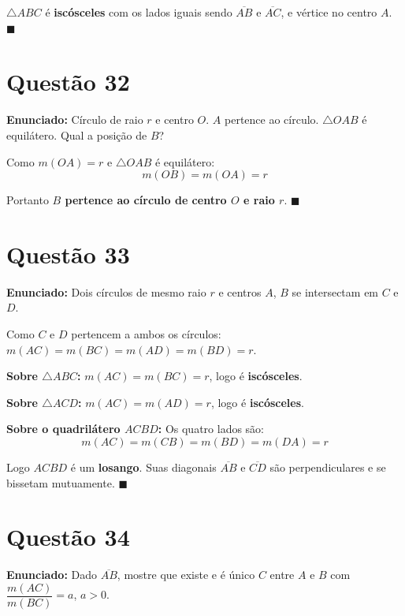 \documentclass[12pt,a4paper]{article}
\begin{document}
$\triangle ABC$ \'e \textbf{isc\'osceles} com os lados iguais sendo $\overline{AB}$ e $\overline{AC}$, e v\'ertice no centro $A$. $\blacksquare$

\section*{Quest\~ao 32}

\textbf{Enunciado:} C\'irculo de raio $r$ e centro $O$. $A$ pertence ao c\'irculo. $\triangle OAB$ \'e equil\'atero. Qual a posi\c{c}\~ao de $B$?

Como $m(OA) = r$ e $\triangle OAB$ \'e equil\'atero:
$$m(OB) = m(OA) = r$$

Portanto \textbf{$B$ pertence ao c\'irculo de centro $O$ e raio $r$}. $\blacksquare$

\section*{Quest\~ao 33}

\textbf{Enunciado:} Dois c\'irculos de mesmo raio $r$ e centros $A$, $B$ se intersectam em $C$ e $D$.

Como $C$ e $D$ pertencem a ambos os c\'irculos: $m(AC) = m(BC) = m(AD) = m(BD) = r$.

\textbf{Sobre $\triangle ABC$:} $m(AC) = m(BC) = r$, logo \'e \textbf{isc\'osceles}.

\textbf{Sobre $\triangle ACD$:} $m(AC) = m(AD) = r$, logo \'e \textbf{isc\'osceles}.

\textbf{Sobre o quadril\'atero $ACBD$:} Os quatro lados s\~ao:
$$m(AC) = m(CB) = m(BD) = m(DA) = r$$

Logo $ACBD$ \'e um \textbf{losango}. Suas diagonais $\overline{AB}$ e $\overline{CD}$ s\~ao perpendiculares e se bissetam mutuamente. $\blacksquare$

\section*{Quest\~ao 34}

\textbf{Enunciado:} Dado $\overline{AB}$, mostre que existe e \'e \'unico $C$ entre $A$ e $B$ com $\dfrac{m(AC)}{m(BC)} = a$, $a > 0$.
\end{document}
